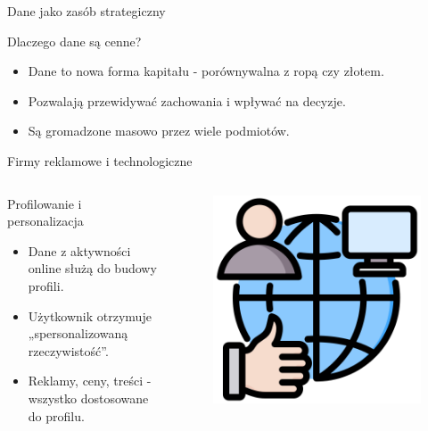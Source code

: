     \begin{frame}{Dane jako zasób strategiczny}
    \begin{alertblock}{Dlaczego dane są cenne?}
        \begin{itemize}
          \item Dane to nowa forma kapitału - porównywalna z ropą czy złotem.
          \item Pozwalają przewidywać zachowania i wpływać na decyzje.
          \item Są gromadzone masowo przez wiele podmiotów.
        \end{itemize}
    \end{alertblock}
    \end{frame}
    
    \begin{frame}{Firmy reklamowe i technologiczne}
    \begin{columns}[c]
        \begin{alertblock}{Profilowanie i personalizacja}
            \begin{itemize}
              \item Dane z aktywności online służą do budowy profili.
              \item Użytkownik otrzymuje „spersonalizowaną rzeczywistość”.
              \item Reklamy, ceny, treści - wszystko dostosowane do profilu. \cite{EFF}
            \end{itemize}
        \end{alertblock}
        \begin{figure}
          \centering
          \includegraphics[height=0.45\textheight]{images/social-network.png}
        \end{figure}
    \end{columns}
    \end{frame}
    
